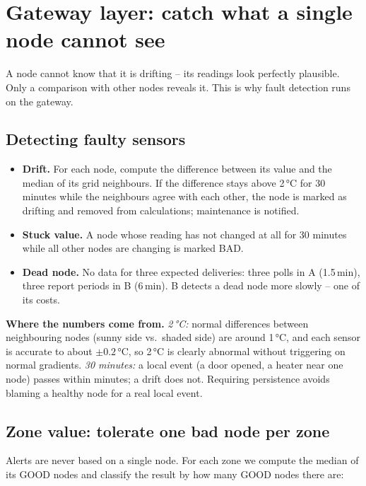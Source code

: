 \documentclass[11pt,a4paper]{report}
\newcommand{\why}[1]{\par\noindent\colorbox{gray!10}{\parbox{\dimexpr\linewidth-2\fboxsep}{\small\textbf{Where the numbers come from.} #1}}\par}
\begin{document}
\section{Gateway layer: catch what a single node cannot see}
A node cannot know that it is drifting -- its readings look perfectly plausible. Only a comparison with other nodes reveals it. This is why fault detection runs on the gateway.

\subsection{Detecting faulty sensors}\label{sec:faultdet}
\begin{itemize}
  \item \textbf{Drift.} For each node, compute the difference between its value and the median of its grid neighbours. If the difference stays above 2\,°C for 30 minutes while the neighbours agree with each other, the node is marked as drifting and removed from calculations; maintenance is notified.
  \item \textbf{Stuck value.} A node whose reading has not changed at all for 30 minutes while all other nodes are changing is marked BAD.
  \item \textbf{Dead node.} No data for three expected deliveries: three polls in A (1.5\,min), three report periods in B (6\,min). B detects a dead node more slowly -- one of its costs.
\end{itemize}

\why{\emph{2\,°C:} normal differences between neighbouring nodes (sunny side vs.\ shaded side) are around 1\,°C, and each sensor is accurate to about $\pm0.2$\,°C, so 2\,°C is clearly abnormal without triggering on normal gradients. \emph{30 minutes:} a local event (a door opened, a heater near one node) passes within minutes; a drift does not. Requiring persistence avoids blaming a healthy node for a real local event.}

\subsection{Zone value: tolerate one bad node per zone}\label{sec:zone}
Alerts are never based on a single node. For each zone we compute the median of its GOOD nodes and classify the result by how many GOOD nodes there are:
\end{document}
